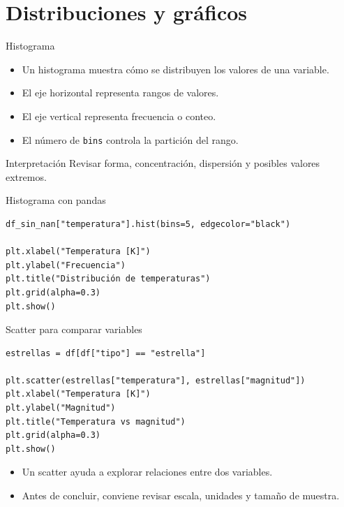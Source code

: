 \documentclass[10pt]{beamer}
\begin{document}
\section{Distribuciones y gráficos}

\begin{frame}{Histograma}
  \begin{itemize}
    \item Un histograma muestra cómo se distribuyen los valores de una variable.
    \item El eje horizontal representa rangos de valores.
    \item El eje vertical representa frecuencia o conteo.
    \item El número de \texttt{bins} controla la partición del rango.
  \end{itemize}
  \begin{block}{Interpretación}
    Revisar forma, concentración, dispersión y posibles valores extremos.
  \end{block}
\end{frame}

\begin{frame}[fragile]{Histograma con pandas}
\begin{verbatim}
df_sin_nan["temperatura"].hist(bins=5, edgecolor="black")

plt.xlabel("Temperatura [K]")
plt.ylabel("Frecuencia")
plt.title("Distribución de temperaturas")
plt.grid(alpha=0.3)
plt.show()
\end{verbatim}
\end{frame}

\begin{frame}[fragile]{Scatter para comparar variables}
\begin{verbatim}
estrellas = df[df["tipo"] == "estrella"]

plt.scatter(estrellas["temperatura"], estrellas["magnitud"])
plt.xlabel("Temperatura [K]")
plt.ylabel("Magnitud")
plt.title("Temperatura vs magnitud")
plt.grid(alpha=0.3)
plt.show()
\end{verbatim}

  \begin{itemize}
    \item Un scatter ayuda a explorar relaciones entre dos variables.
    \item Antes de concluir, conviene revisar escala, unidades y tamaño de muestra.
  \end{itemize}
\end{frame}
\end{document}

